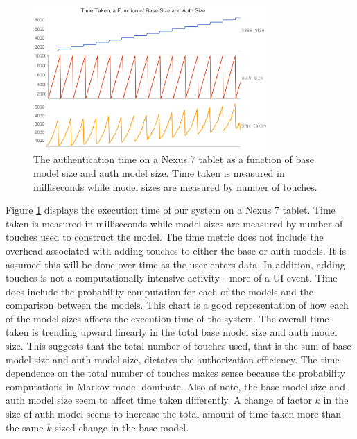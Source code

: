 \documentclass{acm_proc_article-sp}
\begin{document}
\begin{figure}
\centering
\includegraphics[width=3.5in]{nexus_speed_test.png}
\caption{The authentication time on a Nexus 7 tablet as a function of base model size and auth model size. Time taken is measured in milliseconds while model sizes are measured by number of touches.}
\label{fig:nexus_speed_test}
\end{figure}

Figure \ref{fig:nexus_speed_test} displays the execution time of our system on a Nexus 7 tablet. Time taken is measured in milliseconds while model sizes are measured by number of touches used to construct the model. 
The time metric does not include the overhead associated with adding touches to either the base or auth models. It is assumed this will be done over time as the user enters data. In addition, adding touches is not a computationally intensive activity - more of a UI event. 
Time does include the probability computation for each of the models and the comparison between the models.
This chart is a good representation of how each of the model sizes affects the execution time of the system.
 The overall time taken is trending upward linearly in the total base model size and auth model size.
 This suggests that the total number of touches used, that is the sum of base model size and auth model size, dictates the authorization efficiency.
The time dependence on the total number of touches makes sense because the  probability computations in
Markov model dominate. 
Also of note, the base model size and auth model size seem to affect time taken differently. A change of 
factor $k$ in the size of auth model seems to increase the total amount of time taken more than the same $k$-sized change in the base model. 
\end{document}
